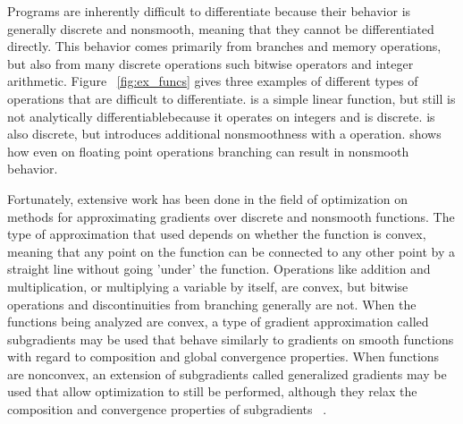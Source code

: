 Programs are inherently difficult to differentiate because their behavior is generally discrete and nonsmooth, meaning that they cannot be differentiated directly. This behavior comes primarily from branches and memory operations, but also from many discrete operations such bitwise operators and integer arithmetic. Figure ~\ref{fig:ex_funcs} gives three examples of different types of operations that are difficult to differentiate.  is a simple linear function, but still is not analytically differentiablebecause it operates on integers and is discrete.  is also discrete, but introduces additional nonsmoothness with a  operation.  shows how even on floating point operations branching can result in nonsmooth behavior.

Fortunately, extensive work has been done in the field of optimization on methods for approximating gradients over discrete and nonsmooth functions. The type of approximation that used depends on whether the function is convex, meaning that any point on the function can be connected to any other point by a straight line without going 'under' the function. Operations like addition and multiplication, or multiplying a variable by itself, are convex, but bitwise operations and discontinuities from branching generally are not. When the functions being analyzed are convex, a type of gradient approximation called subgradients may be used that behave similarly to gradients on smooth functions with regard to composition and global convergence properties. When functions are nonconvex, an extension of subgradients called generalized gradients may be used that allow optimization to still be performed, although they relax the composition and convergence properties of subgradients ~\cite{clarke1990optimization, rockafellar2009variational}.

